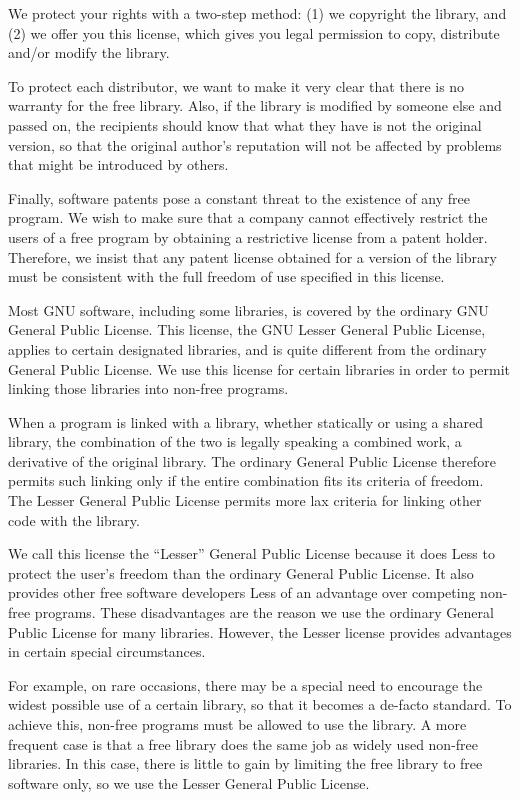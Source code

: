 {We protect your rights with a two-step method: (1) we copyright the library, and 
(2) we offer you this license, which gives you legal permission to copy, 
distribute and/or modify the library.

To protect each distributor, we want to make it very clear that there is no 
warranty for the free library. Also, if the library is modified by someone else 
and passed on, the recipients should know that what they have is not the 
original version, so that the original author's reputation will not be affected 
by problems that might be introduced by others.

Finally, software patents pose a constant threat to the existence of any free 
program. We wish to make sure that a company cannot effectively restrict the 
users of a free program by obtaining a restrictive license from a patent holder. 
Therefore, we insist that any patent license obtained for a version of the 
library must be consistent with the full freedom of use specified in this 
license.

Most GNU software, including some libraries, is covered by the ordinary GNU 
General Public License. This license, the GNU Lesser General Public License, 
applies to certain designated libraries, and is quite different from the 
ordinary General Public License. We use this license for certain libraries in 
order to permit linking those libraries into non-free programs.

When a program is linked with a library, whether statically or using a shared 
library, the combination of the two is legally speaking a combined work, a 
derivative of the original library. The ordinary General Public License 
therefore permits such linking only if the entire combination fits its criteria 
of freedom. The Lesser General Public License permits more lax criteria for 
linking other code with the library.

We call this license the ``Lesser'' General Public License because it does Less to 
protect the user's freedom than the ordinary General Public License. It also 
provides other free software developers Less of an advantage over competing 
non-free programs. These disadvantages are the reason we use the ordinary 
General Public License for many libraries. However, the Lesser license provides 
advantages in certain special circumstances.

For example, on rare occasions, there may be a special need to encourage the 
widest possible use of a certain library, so that it becomes a de-facto 
standard. To achieve this, non-free programs must be allowed to use the library. 
A more frequent case is that a free library does the same job as widely used 
non-free libraries. In this case, there is little to gain by limiting the free 
library to free software only, so we use the Lesser General Public License.

}
